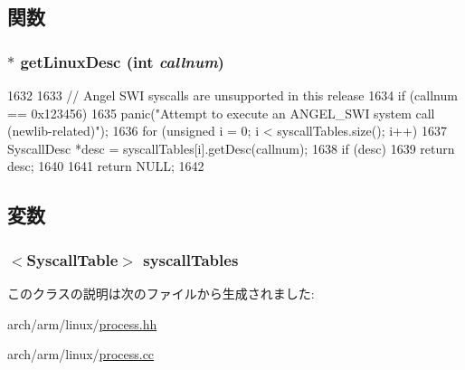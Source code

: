 \subsection{関数}
\hypertarget{classArmLinuxProcessBits_aab44167d5fe3af4a32c5a6a796719df1}{
\subsubsection[{getLinuxDesc}]{ $\ast$ getLinuxDesc (int {\em callnum})}}
\label{classArmLinuxProcessBits_aab44167d5fe3af4a32c5a6a796719df1}



\begin{DoxyCode}
1632 {
1633     // Angel SWI syscalls are unsupported in this release
1634     if (callnum == 0x123456)
1635         panic("Attempt to execute an ANGEL_SWI system call (newlib-related)");
1636     for (unsigned i = 0; i < syscallTables.size(); i++) {
1637         SyscallDesc *desc = syscallTables[i].getDesc(callnum);
1638         if (desc)
1639             return desc;
1640     }
1641     return NULL;
1642 }
\end{DoxyCode}


\subsection{変数}
\hypertarget{classArmLinuxProcessBits_a68edae7aeb855e305134f67b1a47a98d}{
\subsubsection[{syscallTables}]{$<${\bf SyscallTable}$>$ {\bf syscallTables}}}
\label{classArmLinuxProcessBits_a68edae7aeb855e305134f67b1a47a98d}


このクラスの説明は次のファイルから生成されました:\begin{DoxyCompactItemize}
\item 
arch/arm/linux/\hyperlink{arch_2arm_2linux_2process_8hh}{process.hh}\item 
arch/arm/linux/\hyperlink{arch_2arm_2linux_2process_8cc}{process.cc}\end{DoxyCompactItemize}
